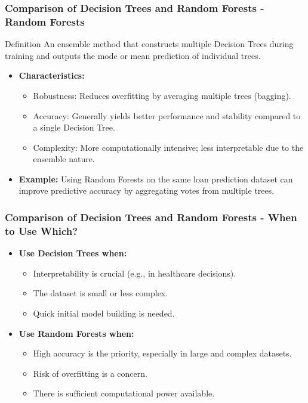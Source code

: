 \documentclass[aspectratio=169]{beamer}
\begin{document}
\begin{frame}
    \frametitle{Comparison of Decision Trees and Random Forests - Random Forests}
    \begin{block}{Definition}
        An ensemble method that constructs multiple Decision Trees during training and outputs the mode or mean prediction of individual trees.
    \end{block}
    
    \begin{itemize}
        \item \textbf{Characteristics:}
        \begin{itemize}
            \item Robustness: Reduces overfitting by averaging multiple trees (bagging).
            \item Accuracy: Generally yields better performance and stability compared to a single Decision Tree.
            \item Complexity: More computationally intensive; less interpretable due to the ensemble nature.
        \end{itemize}
        
        \item \textbf{Example:} 
        Using Random Forests on the same loan prediction dataset can improve predictive accuracy by aggregating votes from multiple trees.
    \end{itemize}
\end{frame}

\begin{frame}
    \frametitle{Comparison of Decision Trees and Random Forests - When to Use Which?}
    \begin{itemize}
        \item \textbf{Use Decision Trees when:}
        \begin{itemize}
            \item Interpretability is crucial (e.g., in healthcare decisions).
            \item The dataset is small or less complex.
            \item Quick initial model building is needed.
        \end{itemize}
        
        \item \textbf{Use Random Forests when:}
        \begin{itemize}
            \item High accuracy is the priority, especially in large and complex datasets.
            \item Risk of overfitting is a concern.
            \item There is sufficient computational power available.
        \end{itemize}
    \end{itemize}
\end{frame}
\end{document}
